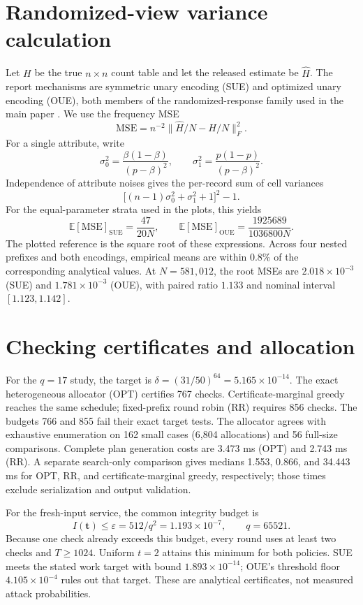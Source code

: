 \documentclass[10pt]{article}
\begin{document}
\section{Randomized-view variance calculation}
Let $H$ be the true $n\times n$ count table and let the released estimate be
$\widehat H$. The report mechanisms are symmetric unary encoding (SUE) and
optimized unary encoding (OUE), both members of the randomized-response family
used in the main paper \cite{warner1965randomized,erlingsson2014rappor,dworkroth2014}.
We use the frequency MSE
\[
  \mathrm{MSE}=n^{-2}\lVert \widehat H/N-H/N\rVert_F^2.
\]
For a single attribute, write
\[
 \sigma_0^2=\frac{\beta(1-\beta)}{(p-\beta)^2},\qquad
 \sigma_1^2=\frac{p(1-p)}{(p-\beta)^2}.
\]
Independence of attribute noises gives the per-record sum of cell variances
\[
 \bigl[(n-1)\sigma_0^2+\sigma_1^2+1\bigr]^2-1.
\]
For the equal-parameter strata used in the plots, this yields
\[
 \mathbb E[\mathrm{MSE}]_{\mathrm{SUE}}=\frac{47}{20N},\qquad
 \mathbb E[\mathrm{MSE}]_{\mathrm{OUE}}=
 \frac{1925689}{1036800N}.
\]
The plotted reference is the square root of these expressions. Across four
nested prefixes and both encodings, empirical means are within 0.8\% of the
corresponding analytical values. At $N=581{,}012$, the root MSEs are
$2.018\times10^{-3}$ (SUE) and $1.781\times10^{-3}$ (OUE), with paired
ratio $1.133$ and nominal interval $[1.123,1.142]$.

\section{Checking certificates and allocation}
For the $q=17$ study, the target is
$\delta=(31/50)^{64}=5.165\times10^{-14}$. The exact heterogeneous
allocator (OPT) certifies 767 checks. Certificate-marginal greedy reaches the same
schedule; fixed-prefix round robin (RR) requires 856 checks. The budgets 766 and
855 fail their exact target tests. The allocator agrees with exhaustive
enumeration on 162 small cases (6,804 allocations) and 56 full-size
comparisons. Complete plan generation costs are 3.473 ms (OPT) and 2.743 ms
(RR). A separate search-only comparison gives medians 1.553, 0.866, and
34.443 ms for OPT, RR, and certificate-marginal greedy, respectively; those
times exclude serialization and output validation.

For the fresh-input service, the common integrity budget is
\[
 I(\mathbf t)\le \varepsilon=512/q^2=1.193\times10^{-7},
 \qquad q=65521.
\]
Because one check already exceeds this budget, every round uses at least two
checks and $T\ge1024$. Uniform $t=2$ attains this minimum for both policies.
SUE meets the stated work target with bound $1.893\times10^{-14}$; OUE's
threshold floor $4.105\times10^{-4}$ rules out that target. These are
analytical certificates, not measured attack probabilities.
\end{document}
